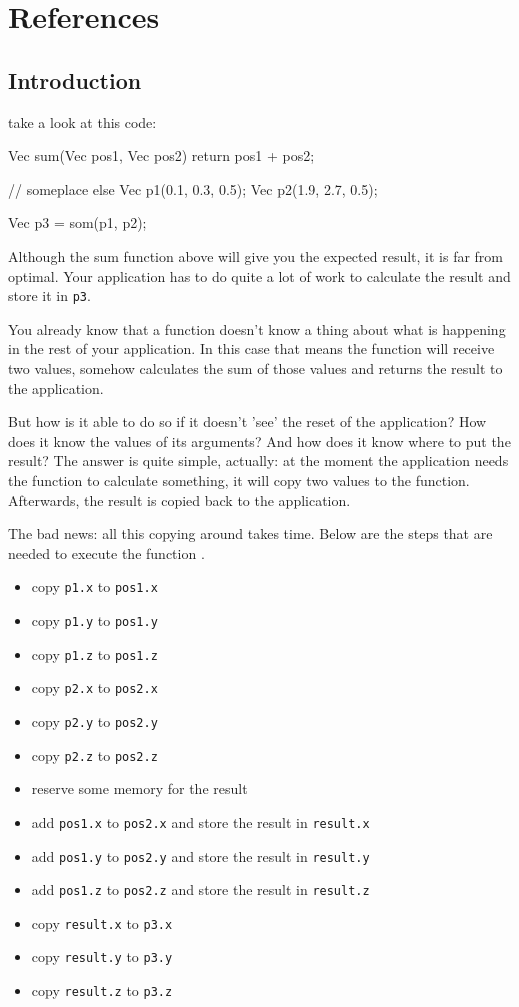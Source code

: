 \chapter{References}
\label{chapter:references}
\section{Introduction}

take a look at this code:

\begin{code}
Vec sum(Vec pos1, Vec pos2) {
  return pos1 + pos2;
}

// someplace else
Vec p1(0.1, 0.3, 0.5);
Vec p2(1.9, 2.7, 0.5);

Vec p3 = som(p1, p2); 
\end{code}

Although the sum function above will give you the expected result, it is far from optimal. Your application has to do quite a lot of work to calculate the result and store it in \texttt{p3}.

You already know that a function doesn't know a thing about what is happening in the rest of your application. In this case that means the function will receive two values, somehow calculates the sum of those values and returns the result to the application.

But how is it able to do so if it doesn't 'see' the reset of the application? How does it know the values of its arguments? And how does it know where to put the result? The answer is quite simple, actually: at the moment the application needs the function  to calculate something, it will copy two values to the function. Afterwards, the result is copied back to the application.

The bad news: all this copying around takes time. Below are the steps that are needed to execute the function .


\begin{itemize}
\item copy \texttt{p1.x} to \texttt{pos1.x}
\item copy \texttt{p1.y} to \texttt{pos1.y}
\item copy \texttt{p1.z} to \texttt{pos1.z}
\item copy \texttt{p2.x} to \texttt{pos2.x}
\item copy \texttt{p2.y} to \texttt{pos2.y}
\item copy \texttt{p2.z} to \texttt{pos2.z}
\item reserve some memory for the result
\item add \texttt{pos1.x} to \texttt{pos2.x} and store the result in \texttt{result.x}
\item add \texttt{pos1.y} to \texttt{pos2.y} and store the result in \texttt{result.y}
\item add \texttt{pos1.z} to \texttt{pos2.z} and store the result in \texttt{result.z}
\item copy \texttt{result.x} to \texttt{p3.x}
\item copy \texttt{result.y} to \texttt{p3.y}
\item copy \texttt{result.z} to \texttt{p3.z}
\end{itemize}


